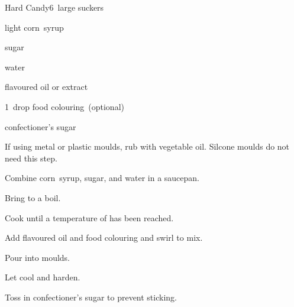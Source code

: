 \begin{recipe}{Hard Candy}{}{6~large suckers}

\begin{ingredients}
\item \C{\third} light corn~syrup
\item {} sugar
\item \C{\half} water
\item \tp{\eighth} flavoured oil or \tp{\quarter} extract
\item 1~drop food colouring~(optional)
\item confectioner's sugar
\end{ingredients}

\begin{directions}
\item If using metal or plastic moulds, rub with vegetable oil. Silcone moulds do not need this step.
\item Combine corn~syrup, sugar, and water in a saucepan.
\item Bring to a boil.
\item Cook until a temperature of  has been reached.
\item Add flavoured oil and food colouring and swirl to mix.
\item Pour into moulds.
\item Let cool and harden.
\item Toss in confectioner's sugar to prevent sticking.
\end{directions}

\end{recipe}
